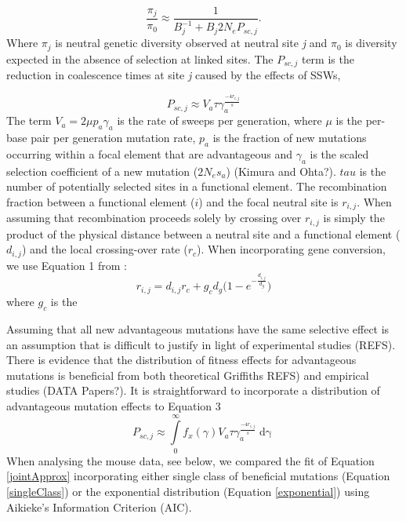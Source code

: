 \documentclass[11pt]{article}
\begin{document}
\begin{equation}
\label{jointApprox}
\frac{\pi_{j}}{\pi_{0}} \approx  \frac{1}{B_{j}^{-1}  + B_{j}2N_eP_{sc,j}}.
\end{equation}
	Where $\pi_j$ is neutral genetic diversity observed at neutral site \textit{j} and $\pi_0$ is diversity expected in the absence of selection at linked sites. The $P_{sc,j}$ term is the reduction in coalescence times at site \textit{j} caused by the effects of SSWs,

\begin{equation}
\label{singleClass}
P_{sc,j} \approx V_a \tau\gamma_a^{\frac{-4r_{i,j}}{s}} 
\end{equation}
The term $V_{a} = 2 \mu p_{a} \gamma_{a}$ is the rate of sweeps per generation, where $\mu$ is the per-base pair per generation mutation rate, $p_a$ is the fraction of new mutations occurring within a focal element that are advantageous and $\gamma_a$ is the scaled selection coefficient of a new mutation ($2N_es_a$) (Kimura and Ohta?). $tau$ is the number of potentially selected sites in a functional element. The recombination fraction between a functional element ($i$) and the focal neutral site is $r_{i,j}$. When assuming that recombination proceeds solely by crossing over $r_{i,j}$ is simply the product of the physical distance between a neutral site and a functional element ($d_{i,j}$) and the local crossing-over rate ($r_c$). When incorporating gene conversion, we use Equation 1 from  \cite{RN361}:
 		\begin{equation}
		\label{geneConversion}
		r_{i,j} = d_{i,j} r_c + g_c d_g \Bigg( 1 - e ^{-\frac{d_{i,j}}{d_g}} \Bigg)
		\end{equation} where $g_c$ is the 
	

	Assuming that all new advantageous mutations have the same selective effect is an assumption that is difficult to justify in light of experimental studies (REFS). There is evidence that the distribution of fitness effects for advantageous mutations is beneficial from both theoretical \cite{RN362} Griffiths REFS) and empirical studies (DATA Papers?). It is straightforward to incorporate a distribution of advantageous mutation effects to Equation 3
		\begin{equation}
		\label{exponential}
P_{sc,j} \approx \int \limits_{0}^{\infty} f_x(\gamma) V_a \tau\gamma_a^{\frac{-4r_{i,j}}{s}} \mathop{d\gamma}
		\end{equation}
When analysing the mouse data, see below, we compared the fit of Equation \ref{jointApprox} incorporating either single class of beneficial mutations (Equation \ref{singleClass}) or the exponential distribution (Equation \ref{exponential}) using Aikieke's Information Criterion (AIC).
	
\end{document}
